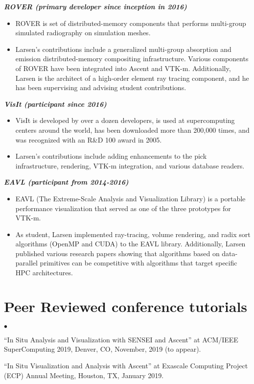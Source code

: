 \documentclass[margin,line]{res}
\newenvironment{list2}{
  \begin{list}{$\bullet$}{%
      \setlength{\itemsep}{0in}
      \setlength{\parsep}{0in} \setlength{\parskip}{0in}
      \setlength{\topsep}{0in} \setlength{\partopsep}{0in}
      \setlength{\leftmargin}{0.2in}}}{\end{list}}
\begin{document}
\begin{resume}
{\em \textbf{ROVER (primary developer since inception in 2016)} }
\begin{itemize}
	\item ROVER is set of distributed-memory components that performs multi-group simulated radiography on simulation meshes.
	\item Larsen's contributions include a generalized multi-group absorption and emission distributed-memory compositing infrastructure. Various components of ROVER have been integrated into Ascent and VTK-m. Additionally,
	Larsen is the architect of a high-order element ray tracing component, and he has been supervising and advising student contributions.
\end{itemize}

{\em \textbf{VisIt (participant since 2016)} }
\begin{itemize}
	\item VisIt is developed by over a dozen developers, is used at supercomputing centers around the
	world, has been downloaded more than 200,000 times, and was recognized with an R\&D 100
	award in 2005.
	\item Larsen's contributions include adding enhancements to the pick infrastructure, rendering, VTK-m integration, and various database readers.
\end{itemize}

{\em \textbf{EAVL (participant from 2014-2016)} }
\begin{itemize}
	\item EAVL (The Extreme-Scale Analysis and Visualization Library) is a portable performance visualization that served as one of the three prototypes for VTK-m.
	\item As student, Larsen implemented ray-tracing, volume rendering, and radix sort algorithms (OpenMP and CUDA) to the EAVL library. Additionally, Larsen published various research papers showing that algorithms based on data-parallel primitives can be competitive with algorithms that target specific HPC architectures.
\end{itemize}





\section{\sc Peer Reviewed conference tutorials}
\begin{list2}
	\item ``In Situ Analysis and Visualization with SENSEI and Ascent'' at ACM/IEEE SuperComputing 2019, Denver, CO, November, 2019 (to appear).
	\item ``In Situ Visualization and Analysis with Ascent'' at Exascale Computing Project (ECP) Annual
	Meeting, Houston, TX, January 2019.
\end{list2}


\end{resume}
\end{document}
